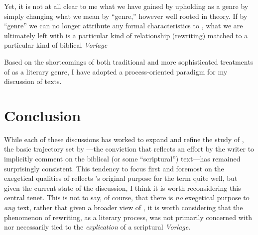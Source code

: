  Yet, it is not at all clear to me what we have gained by upholding \rwb as a genre by simply changing what we mean by ``genre,'' however well rooted in theory.\autocite[Machiela critiques Zahn's approach for similar reasons. See][]{machiela_jjs2010} If by ``genre'' we can no longer attribute any formal characteristics to \rwb, what we are ultimately left with is a particular kind of relationship (rewriting) matched to a particular kind of biblical \emph{Vorlage} 

 Based on the shortcomings of both traditional and more sophisticated treatments of \rwb as a literary genre, I have adopted a process-oriented paradigm for my discussion of \rwb texts.\autocite[I am in broad agreement with Campbell's treatment of the matter. See][64--67]{campbell_zsengeller2014} 

 \hypertarget{conclusion}{%
\section{Conclusion}\label{conclusion}} 

 While each of these discussions has worked to expand and refine the study of \rwb, the basic trajectory set by \vermes---the conviction that \rwb reflects an effort by the writer to implicitly comment on the biblical (or some ``scriptural'') text---has remained surprisingly consistent. This tendency to focus first and foremost on the exegetical qualities of \rwb reflects \vermes's original purpose for the term quite well, but given the current state of the discussion, I think it is worth reconsidering this central tenet. This is not to say, of course, that there is \emph{no} exegetical purpose to \emph{any} \rwb text, rather that given a broader view of \rwb, it is worth considering that the phenomenon of rewriting, as a literary process, was not primarily concerned with nor necessarily tied to the \emph{explication} of a scriptural \emph{Vorlage}. 

